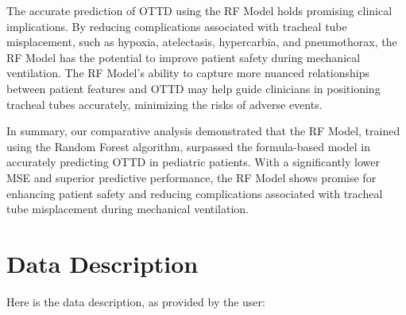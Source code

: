 \documentclass[11pt]{article}
\begin{document}
The accurate prediction of OTTD using the RF Model holds promising clinical implications. By reducing complications associated with tracheal tube misplacement, such as hypoxia, atelectasis, hypercarbia, and pneumothorax, the RF Model has the potential to improve patient safety during mechanical ventilation. The RF Model's ability to capture more nuanced relationships between patient features and OTTD may help guide clinicians in positioning tracheal tubes accurately, minimizing the risks of adverse events.

In summary, our comparative analysis demonstrated that the RF Model, trained using the Random Forest algorithm, surpassed the formula-based model in accurately predicting OTTD in pediatric patients. With a significantly lower MSE and superior predictive performance, the RF Model shows promise for enhancing patient safety and reducing complications associated with tracheal tube misplacement during mechanical ventilation.


\clearpage
\appendix

\section{Data Description} \label{sec:data_description} Here is the data description, as provided by the user:
\end{document}

